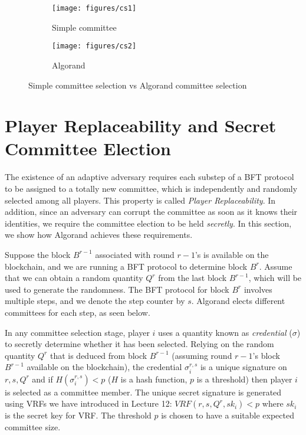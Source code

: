 \documentclass{article}
\begin{document}
\begin{figure}[htb]
    \centering
    \begin{subfigure}[b]{0.45\textwidth}
         \centering
         \texttt{[image: figures/cs1]}
         \caption{Simple committee}
         \label{fig:blockchain1}
     \end{subfigure}
     \hfill
     \begin{subfigure}[b]{0.45\textwidth}
         \centering
         \texttt{[image: figures/cs2]}
         \caption{Algorand}
         \label{fig:blockchain2}
     \end{subfigure}
     \caption{Simple committee selection vs Algorand committee selection}
    \label{fig:two-blockchain}
\end{figure}

\section*{Player Replaceability and Secret Committee Election}

The existence of an adaptive adversary requires each substep of a BFT protocol to be assigned to a totally new committee, which is independently and randomly selected among all players. This property is called \emph{Player Replaceability}. In addition, since an adversary can corrupt the committee as soon as it knows their identities, we require the committee election to be held \emph{secretly}. In this section, we show how Algorand achieves these requirements.

Suppose the block $B^{r-1}$ associated with round $r-1$'s is available on the blockchain, and we are running a BFT protocol to determine block $B^r$. Assume that we can obtain a random quantity $Q^r$ from the last block $B^{r-1}$, which will be used to generate the randomness. The BFT protocol for block $B^r$ involves multiple steps, and we denote the step counter by $s$. Algorand elects different committees for each step, as seen below. 

In any committee selection stage, player $i$ uses a quantity known as \emph{credential} ($\sigma$)  to secretly determine whether it has been selected. Relying on the random quantity $Q^r$ that is deduced from block $B^{r-1}$ (assuming round $r-1$'s block $B^{r-1}$ available on the blockchain), the credential $\sigma_i^{r,s}$ is a unique signature on $r,s,Q^r$ and if $H(\sigma_i^{r,s})<p$ ($H$ is a hash function, $p$ is a threshold) then player $i$ is selected as a committee member.  The unique secret signature is generated using  VRFs we have introduced in Lecture 12: $VRF(r,s,Q^r,sk_i)<p$ where $sk_i$ is the secret key for VRF. 
The threshold $p$ is chosen  to have a suitable expected committee size.
\end{document}
